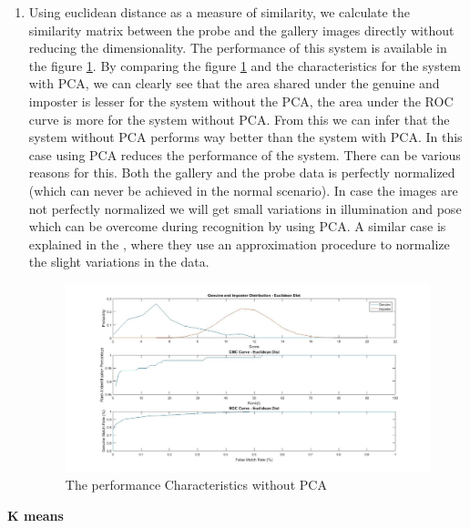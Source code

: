 \documentclass[conference]{IEEEtran}
\begin{document}
\begin{enumerate}
\item Using euclidean distance as a measure of similarity, we calculate the similarity matrix between the probe and the gallery images directly without reducing the dimensionality. The performance of this system is available in the figure \ref{withoutPCA}. By comparing the figure \ref{withoutPCA} and the characteristics for the system with PCA, we can clearly see that the area shared under the genuine and imposter is lesser for the system without the PCA, the area under the ROC curve is more for the system without PCA. From this we can infer that the system without PCA performs way better than the system with PCA. In this case using PCA reduces the performance of the system. There can be various reasons for this. Both the gallery and the probe data is perfectly normalized (which can never be achieved in the normal scenario). In case the images are not perfectly normalized we will get small variations in illumination and pose which can be overcome during recognition by using PCA. A similar case is explained in the \cite{PcaForFaceFirst}, where they use an approximation procedure to normalize the slight variations in the data. 
\begin{figure}
\centering
\includegraphics[width=20cm]{PerformanceWithoutPCA.jpg}
\caption{The performance Characteristics without PCA}
\label{withoutPCA}
\end{figure}

\end{enumerate}
\textbf{K means}
\end{document}
